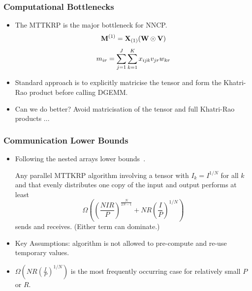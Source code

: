\documentclass{beamer}
\newcommand{\pr}[1]{\left(#1\right)}
\begin{document}
\begin{frame}
\frametitle{Computational Bottlenecks}
\begin{itemize}
\item The MTTKRP is the major bottleneck for NNCP.
$$\Mn{M}{1} = \Mz{X}{1}(\M{W} \Khat \M{V})$$
$$\ME{M}{ir} = \sum_{j=1}^J \sum_{k=1}^K \TE{X}{ijk} \ME{V}{jr} \ME{W}{kr}$$
\item Standard approach is to explicitly matricise the tensor and form the Khatri-Rao product before calling DGEMM.
\item Can we do better? Avoid matricisation of the tensor and full Khatri-Rao products ...
\end{itemize}
\end{frame}

\begin{frame}
\frametitle{Communication Lower Bounds}
\begin{itemize}
\item Following the nested arrays lower bounds~\cite{BKR2017}.
\begin{theorem}
Any parallel MTTKRP algorithm involving a tensor with $I_k=I^{1/N}$ for all $k$ and that evenly distributes one copy of the input and output performs at least
\begin{equation*}
\Omega\left( \left( \frac{NIR}{P} \right)^{\frac{N}{2N-1}} + NR\left(\frac{I}{P}\right)^{1/N} \right)
\end{equation*}
sends and receives.  (Either term can dominate.)
\end{theorem}
\item Key Assumptions: algorithm is not allowed to pre-compute and re-use temporary values.
\item $\Omega\pr{NR\pr{\frac I P}^{1/N}}$ is the most frequently occurring case for relatively small $P$ or $R$.
\end{itemize}
\end{frame}
\end{document}
